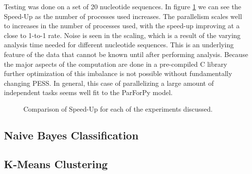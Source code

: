 \documentclass[conference]{IEEEtran}
\begin{document}
Testing was done on a set of 20 nucleotide sequences.
In figure \ref{SpeedUpResults} we can see the Speed-Up as the number of processes
used increases.
The parallelism scales well to increases in the number of processes used, with
the speed-up improving at a close to 1-to-1 rate.
Noise is seen in the scaling, which is a result of the varying analysis time
needed for different nucleotide sequences. 
This is an underlying feature of the data that cannot be known until after performing 
analysis.
Because the major aspects of the computation are done in a pre-compiled C library further
optimization of this imbalance is not possible without fundamentally changing PESS.
In general, this case of parallelizing a large amount of independent tasks seems well fit to the ParForPy model.

\begin{figure}[t]
\centering
{}
\caption{Comparison of Speed-Up for each of the experiments discussed.}
\label{SpeedUpResults}
\end{figure}


\subsection{Naive Bayes Classification}




\subsection{K-Means Clustering}
\end{document}
